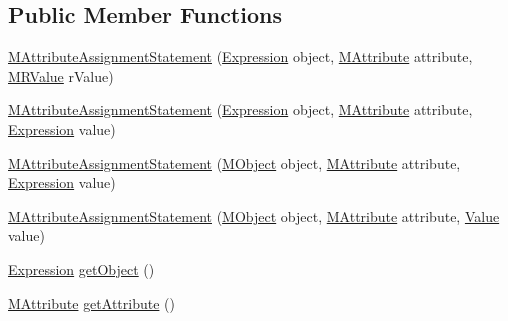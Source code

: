 \subsection*{Public Member Functions}
\begin{DoxyCompactItemize}
\item 
\hyperlink{classorg_1_1tzi_1_1use_1_1uml_1_1sys_1_1soil_1_1_m_attribute_assignment_statement_affcbb774204792cff2b8aeeec9079ea1}{M\-Attribute\-Assignment\-Statement} (\hyperlink{classorg_1_1tzi_1_1use_1_1uml_1_1ocl_1_1expr_1_1_expression}{Expression} object, \hyperlink{classorg_1_1tzi_1_1use_1_1uml_1_1mm_1_1_m_attribute}{M\-Attribute} attribute, \hyperlink{classorg_1_1tzi_1_1use_1_1uml_1_1sys_1_1soil_1_1_m_r_value}{M\-R\-Value} r\-Value)
\item 
\hyperlink{classorg_1_1tzi_1_1use_1_1uml_1_1sys_1_1soil_1_1_m_attribute_assignment_statement_acaa1c4a0dfbee25cf2b59d067299fc4a}{M\-Attribute\-Assignment\-Statement} (\hyperlink{classorg_1_1tzi_1_1use_1_1uml_1_1ocl_1_1expr_1_1_expression}{Expression} object, \hyperlink{classorg_1_1tzi_1_1use_1_1uml_1_1mm_1_1_m_attribute}{M\-Attribute} attribute, \hyperlink{classorg_1_1tzi_1_1use_1_1uml_1_1ocl_1_1expr_1_1_expression}{Expression} value)
\item 
\hyperlink{classorg_1_1tzi_1_1use_1_1uml_1_1sys_1_1soil_1_1_m_attribute_assignment_statement_ad71f338c8b9ab655ad96f370cf3ac93f}{M\-Attribute\-Assignment\-Statement} (\hyperlink{interfaceorg_1_1tzi_1_1use_1_1uml_1_1sys_1_1_m_object}{M\-Object} object, \hyperlink{classorg_1_1tzi_1_1use_1_1uml_1_1mm_1_1_m_attribute}{M\-Attribute} attribute, \hyperlink{classorg_1_1tzi_1_1use_1_1uml_1_1ocl_1_1expr_1_1_expression}{Expression} value)
\item 
\hyperlink{classorg_1_1tzi_1_1use_1_1uml_1_1sys_1_1soil_1_1_m_attribute_assignment_statement_ac21174b84309070b61ec44404028a72a}{M\-Attribute\-Assignment\-Statement} (\hyperlink{interfaceorg_1_1tzi_1_1use_1_1uml_1_1sys_1_1_m_object}{M\-Object} object, \hyperlink{classorg_1_1tzi_1_1use_1_1uml_1_1mm_1_1_m_attribute}{M\-Attribute} attribute, \hyperlink{classorg_1_1tzi_1_1use_1_1uml_1_1ocl_1_1value_1_1_value}{Value} value)
\item 
\hyperlink{classorg_1_1tzi_1_1use_1_1uml_1_1ocl_1_1expr_1_1_expression}{Expression} \hyperlink{classorg_1_1tzi_1_1use_1_1uml_1_1sys_1_1soil_1_1_m_attribute_assignment_statement_afcd44e7481d66c4b3d61a37ab148e086}{get\-Object} ()
\item 
\hyperlink{classorg_1_1tzi_1_1use_1_1uml_1_1mm_1_1_m_attribute}{M\-Attribute} \hyperlink{classorg_1_1tzi_1_1use_1_1uml_1_1sys_1_1soil_1_1_m_attribute_assignment_statement_a1ae1e9e1c6adf6925811dcf5642c8455}{get\-Attribute} ()

\end{DoxyCompactItemize}
